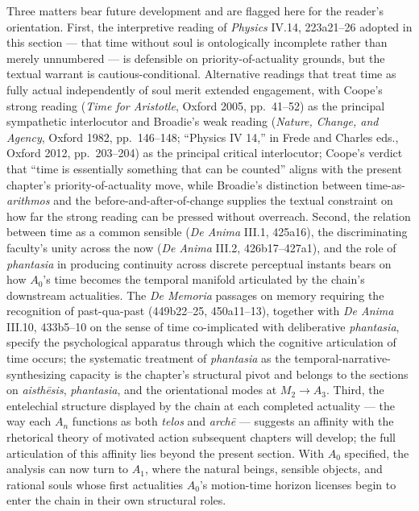 \documentclass{article}
\begin{document}
Three matters bear future development and are flagged here for the reader's orientation. First, the interpretive reading of \textit{Physics} IV.14, 223a21--26 adopted in this section --- that time without soul is ontologically incomplete rather than merely unnumbered --- is defensible on priority-of-actuality grounds, but the textual warrant is cautious-conditional. Alternative readings that treat time as fully actual independently of soul merit extended engagement, with Coope's strong reading (\textit{Time for Aristotle}, Oxford 2005, pp.~41--52) as the principal sympathetic interlocutor and Broadie's weak reading (\textit{Nature, Change, and Agency}, Oxford 1982, pp.~146--148; ``Physics IV 14,'' in Frede and Charles eds., Oxford 2012, pp.~203--204) as the principal critical interlocutor; Coope's verdict that ``time is essentially something that can be counted'' aligns with the present chapter's priority-of-actuality move, while Broadie's distinction between time-as-\textit{arithmos} and the before-and-after-of-change supplies the textual constraint on how far the strong reading can be pressed without overreach. Second, the relation between time as a common sensible (\textit{De Anima} III.1, 425a16), the discriminating faculty's unity across the now (\textit{De Anima} III.2, 426b17--427a1), and the role of \textit{phantasia} in producing continuity across discrete perceptual instants bears on how $A_0$'s time becomes the temporal manifold articulated by the chain's downstream actualities. The \textit{De Memoria} passages on memory requiring the recognition of past-qua-past (449b22--25, 450a11--13), together with \textit{De Anima} III.10, 433b5--10 on the sense of time co-implicated with deliberative \textit{phantasia}, specify the psychological apparatus through which the cognitive articulation of time occurs; the systematic treatment of \textit{phantasia} as the temporal-narrative-synthesizing capacity is the chapter's structural pivot and belongs to the sections on \textit{aisthēsis}, \textit{phantasia}, and the orientational modes at $M_2 \rightarrow A_3$. Third, the entelechial structure displayed by the chain at each completed actuality --- the way each $A_n$ functions as both \textit{telos} and \textit{archē} --- suggests an affinity with the rhetorical theory of motivated action subsequent chapters will develop; the full articulation of this affinity lies beyond the present section. With $A_0$ specified, the analysis can now turn to $A_1$, where the natural beings, sensible objects, and rational souls whose first actualities $A_0$'s motion-time horizon licenses begin to enter the chain in their own structural roles.
\end{document}
